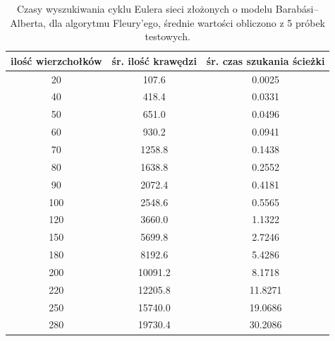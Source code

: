\documentclass[a4paper, 12pt, twoside, openright]{article}
\begin{document}
\begin{table}[!p]
	\centering
	\caption{Czasy wyszukiwania cyklu Eulera sieci złożonych o modelu Barabási–Alberta, dla algorytmu Fleury'ego, średnie wartości obliczono z 5 próbek testowych.}
	
	\resizebox{16cm}{!}
	{
		\begin{tabular}{|c c c|}
			\hline
			ilość wierzchołków	& śr. ilość krawędzi 	& śr. czas szukania ścieżki	\\ \hline \hline
			20 	& 107.6 	 	& 0.0025	\\ \hline
			40 	& 418.4 		& 0.0331	\\ \hline
			50 	& 651.0 	 	& 0.0496	\\ \hline
			60 	& 930.2 		& 0.0941	\\ \hline
			70 	& 1258.8      	& 0.1438	\\ \hline
			80 	& 1638.8     	& 0.2552	\\ \hline
			90  & 2072.4    	& 0.4181	\\ \hline
			100 & 2548.6    	& 0.5565	\\ \hline
			120 & 3660.0    	& 1.1322	\\ \hline
			150 & 5699.8   		& 2.7246	\\ \hline
			180 & 8192.6     	& 5.4286	\\ \hline
			200 & 10091.2 		& 8.1718	\\ \hline
			220 & 12205.8 		& 11.8271	\\ \hline
			250 & 15740.0 		& 19.0686	\\ \hline
			280 & 19730.4 		& 30.2086	\\ \hline
		\end{tabular} 
	}
	\label{Tab:BA_Fleury}
\end{table}
\end{document}
